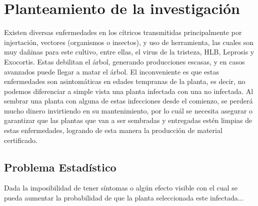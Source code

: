\chapter{Planteamiento de la investigaci\'{o}n}
Existen diversas enfermedades en los c\'{i}tricos transmitidas principalmente por injertaci\'{o}n, vectores (organismos o insectos), y uso de herramienta, las cuales son muy da\~{n}inas para este cultivo, entre ellas, el virus de la tristeza, HLB, Leprosis y Exocortis. Estas debilitan el \'{a}rbol, generando producciones escasas, y en casos avanzados puede llegar a matar el \'{a}rbol. El inconveniente es que estas enfermedades son asintom\'{a}ticas en edades tempranas de la planta, es decir, no podemos diferenciar a simple vista una planta infectada con una no infectada. Al sembrar una planta con alguna de estas infecciones desde el comienzo, se perder\'{a} mucho dinero invirtiendo en su mantenimiento, por lo cu\'{a}l se necesita asegurar o garantizar que las plantas que van a ser sembradas y entregadas est\'{e}n limpias de estas enfermedades, logrando de esta manera la producci\'{o}n de material certificado.\\

\section{Problema Estad\'{i}stico}
Dada la imposibilidad de tener s\'{i}ntomas o alg\'{u}n efecto visible con el cual se pueda aumentar la probabilidad de que la planta seleccionada este infectada...


